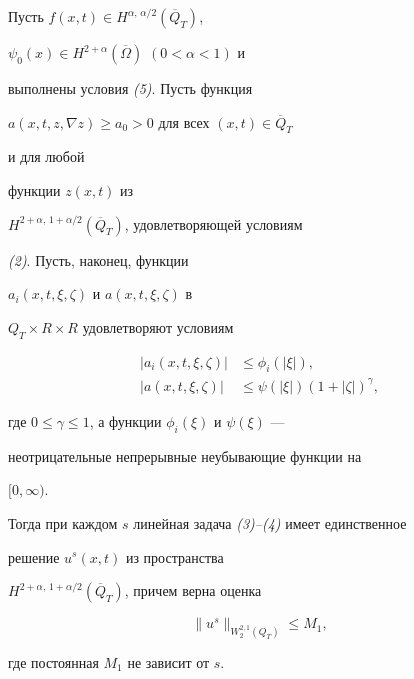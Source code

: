 \begin{lem}


Пусть $f(x,t)\in H^{\alpha,\,\alpha/2}(\overline Q_T)$,


$\psi_0(x)\in H^{2+\alpha}(\overline\Omega)$ $(0<\alpha<1)$ и


выполнены условия {\em (5)}. Пусть функция


$a(x,t,z,\nabla z)\ge a_0>0$ для всех $(x,t)\in\overline Q_T$


и для любой


функции $z(x,t)$ из


$H^{2+\alpha,\,1+\alpha/2}(\overline Q_T)$, удовлетворяющей условиям


{\em (2)}. Пусть, наконец, функции


$a_i(x,t,\xi,\zeta)$ и $a(x,t,\xi,\zeta)$ в


$Q_T\times R\times R$ удовлетворяют условиям


\begin{align}


|a_i(x,t,\xi,\zeta)|&\le \phi_i(|\xi|),\\


|a(x,t,\xi,\zeta)|&\le \psi(|\xi|)(1+|\zeta|)^\gamma,


\end{align}


где $0\le\gamma\le 1$, а функции $\phi_i(\xi)$ и $\psi(\xi)$ ---


неотрицательные непрерывные неубывающие функции на


$[0,\infty)$.





Тогда при каждом $s$ линейная задача {\em (3)--(4)} имеет единственное


решение $u^s(x,t)$ из пространства


$H^{2+\alpha,\,1+\alpha/2}(\overline Q_T)$, причем верна оценка


\begin{equation}


\|u^s\|_{W^{2,1}_2(Q_T)}\le M_1,


\end{equation}


где постоянная $M_1$ не зависит от $s$.


\end{lem}





